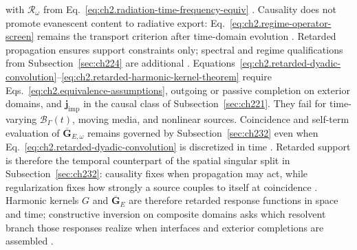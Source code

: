 with \(\mathcal{R}_\omega\) from Eq.~\eqref{eq:ch2.radiation-time-frequency-equiv}
\cite{stratton1941}. Causality does not promote evanescent content to
radiative export: Eq.~\eqref{eq:ch2.regime-operator-screen} remains the transport criterion
after time-domain evolution \cite{stratton1941}. Retarded propagation ensures support
constraints only; spectral and regime qualifications from Subsection~\ref{sec:ch224} are
additional \cite{harrington2001}.
Equations~\eqref{eq:ch2.retarded-dyadic-convolution}--\eqref{eq:ch2.retarded-harmonic-kernel-theorem}
require Eqs.~\eqref{eq:ch2.equivalence-assumptions}, outgoing or passive completion on
exterior domains, and \(\mathbf{j}_{\mathrm{imp}}\) in the causal class of
Subsection~\ref{sec:ch221}. They fail for time-varying \(\mathcal{B}_\Gamma(t)\),
moving media, and nonlinear sources. Coincidence and self-term evaluation of
\(\overline{\mathbf{G}}_{E,\omega}\) remains governed by Subsection~\ref{sec:ch232}
even when Eq.~\eqref{eq:ch2.retarded-dyadic-convolution} is discretized in time
\cite{harrington2001}. Retarded support is therefore the temporal counterpart of the spatial
singular split in Subsection~\ref{sec:ch232}: causality fixes when propagation may act, while
regularization fixes how strongly a source couples to itself at coincidence
\cite{stratton1941}. Harmonic kernels $G$ and $\overline{\mathbf{G}}_{E}$ are therefore
retarded response functions in space and time; constructive inversion on composite domains asks
which resolvent branch those responses realize when interfaces and exterior completions are
assembled \cite{stratton1941}.
